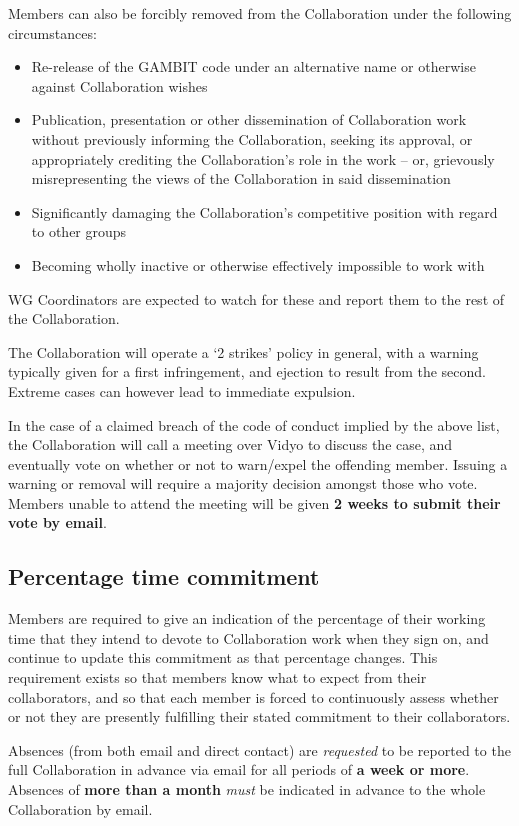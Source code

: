 Members can also be forcibly removed from the Collaboration under the following circumstances:\begin{itemize}
\item Re-release of the GAMBIT code under an alternative name or otherwise against Collaboration wishes 
\item Publication, presentation or other dissemination of Collaboration work without previously informing the Collaboration, seeking its approval, or appropriately crediting the Collaboration's role in the work -- or, grievously misrepresenting the views of the Collaboration in said dissemination
\item Significantly damaging the Collaboration's competitive position with regard to other groups 
\item Becoming wholly inactive or otherwise effectively impossible to work with
\end{itemize}
WG Coordinators are expected to watch for these and report them to the rest of the Collaboration.

The Collaboration will operate a `2 strikes' policy in general, with a warning typically given for a first infringement, and ejection to result from the second.  Extreme cases can however lead to immediate expulsion.

In the case of a claimed breach of the code of conduct implied by the above list, the Collaboration will call a meeting over Vidyo to discuss the case, and eventually vote on whether or not to warn/expel the offending member.  Issuing a warning or removal will require a majority decision amongst those who vote.  Members unable to attend the meeting will be given \textbf{2 weeks to submit their vote by email}.

\subsection{Percentage time commitment}

Members are required to give an indication of the percentage of their working time that they intend to devote to Collaboration work when they sign on, and continue to update this commitment as that percentage changes.  This requirement exists so that members know what to expect from their collaborators, and so that each member is forced to continuously assess whether or not they are presently fulfilling their stated commitment to their collaborators.

Absences (from both email and direct contact) are \textit{requested} to be reported to the full Collaboration in advance via email for all periods of \textbf{a week or more}.  Absences of \textbf{more than a month} \textit{must} be indicated in advance to the whole Collaboration by email.

